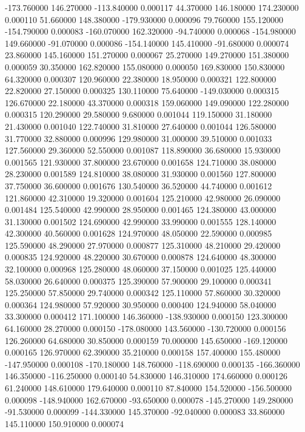 -173.760000 146.270000 -113.840000 0.000117 
44.370000 146.180000 174.230000 0.000110 
51.660000 148.380000 -179.930000 0.000096 
79.760000 155.120000 -154.790000 0.000083 
-160.070000 162.320000 -94.740000 0.000068 
-154.980000 149.660000 -91.070000 0.000086 
-154.140000 145.410000 -91.680000 0.000074 
23.860000 145.160000 151.270000 0.000067 
25.270000 149.270000 151.380000 0.000059 
30.350000 162.820000 155.080000 0.000050 
169.830000 150.830000 64.320000 0.000307 
120.960000 22.380000 18.950000 0.000321 
122.800000 22.820000 27.150000 0.000325 
130.110000 75.640000 -149.030000 0.000315 
126.670000 22.180000 43.370000 0.000318 
159.060000 149.090000 122.280000 0.000315 
120.290000 29.580000 9.680000 0.001044 
119.150000 31.180000 21.430000 0.001040 
122.740000 31.810000 27.640000 0.001044 
126.580000 31.770000 32.880000 0.000996 
129.980000 31.000000 39.510000 0.001033 
127.560000 29.360000 52.550000 0.001087 
118.890000 36.680000 15.930000 0.001565 
121.930000 37.800000 23.670000 0.001658 
124.710000 38.080000 28.230000 0.001589 
124.810000 38.080000 31.930000 0.001560 
127.800000 37.750000 36.600000 0.001676 
130.540000 36.520000 44.740000 0.001612 
121.860000 42.310000 19.320000 0.001604 
125.210000 42.980000 26.090000 0.001484 
125.540000 42.990000 28.950000 0.001465 
124.380000 43.000000 31.130000 0.001502 
124.690000 42.990000 33.990000 0.001555 
128.140000 42.300000 40.560000 0.001628 
124.970000 48.050000 22.590000 0.000985 
125.590000 48.290000 27.970000 0.000877 
125.310000 48.210000 29.420000 0.000835 
124.920000 48.220000 30.670000 0.000878 
124.640000 48.300000 32.100000 0.000968 
125.280000 48.060000 37.150000 0.001025 
125.440000 58.030000 26.640000 0.000375 
125.390000 57.900000 29.100000 0.000341 
125.250000 57.850000 29.740000 0.000342 
125.110000 57.860000 30.320000 0.000364 
124.980000 57.920000 30.950000 0.000400 
124.940000 58.040000 33.300000 0.000412 
171.100000 146.360000 -138.930000 0.000150 
123.300000 64.160000 28.270000 0.000150 
-178.080000 143.560000 -130.720000 0.000156 
126.260000 64.680000 30.850000 0.000159 
70.000000 145.650000 -169.120000 0.000165 
126.970000 62.390000 35.210000 0.000158 
157.400000 155.480000 -147.950000 0.000108 
-170.180000 148.760000 -118.690000 0.000135 
-166.360000 146.350000 -116.250000 0.000140 
54.830000 146.310000 174.660000 0.000126 
61.240000 148.610000 179.640000 0.000110 
87.840000 154.520000 -156.500000 0.000098 
-148.940000 162.670000 -93.650000 0.000078 
-145.270000 149.280000 -91.530000 0.000099 
-144.330000 145.370000 -92.040000 0.000083 
33.860000 145.110000 150.910000 0.000074 
